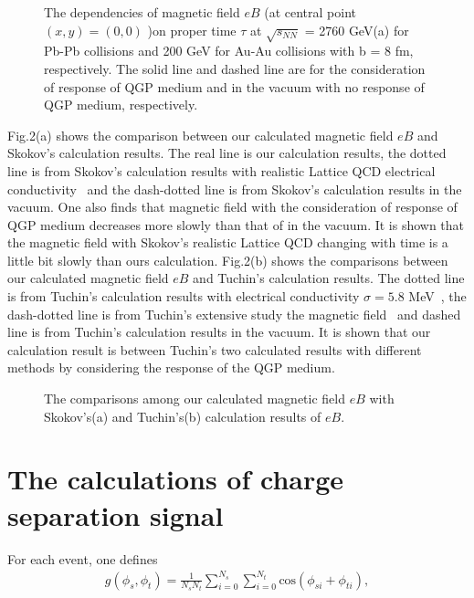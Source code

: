 \documentclass[twocolumn,showpacs,preprintnumbers,amsmath,amssymb]{revtex4}
\begin{document}
\begin{figure}[h!]
\centering {}
\caption{The dependencies of magnetic field $eB$ (at central point $(x, y) = (0, 0)$ )on proper time $\tau$ at $\sqrt{s_{NN}}$ = 2760 GeV(a) for Pb-Pb collisions
and 200 GeV for Au-Au collisions with b = 8 fm, respectively. The solid line and dashed line are for the consideration of response of QGP medium and in the vacuum with no
response of QGP medium, respectively.}
\label{fig1} %
\end{figure}

Fig.2(a) shows the comparison between our calculated magnetic field $eB$ and Skokov's calculation results. The real line is our calculation results, the dotted line is from Skokov's calculation results with realistic Lattice QCD electrical conductivity~\cite{lab19} and the dash-dotted line is from Skokov's calculation results in the vacuum. One also finds that magnetic field with the consideration of response of QGP medium decreases more slowly than that of in the vacuum. It is shown that the magnetic field with Skokov's realistic Lattice QCD changing with time is a little bit slowly than ours calculation. Fig.2(b) shows the comparisons between our calculated magnetic field $eB$ and Tuchin's calculation results. The dotted line is from Tuchin's calculation results with electrical conductivity $\sigma=5.8$ MeV~\cite{lab17}, the dash-dotted line is from Tuchin's  extensive study the magnetic field~\cite{lab21}
and dashed line is from Tuchin's calculation results in the vacuum.
It is shown that our calculation result is between Tuchin's two calculated results with different methods by considering the response of the QGP medium.


\hskip0.2cm

\begin{figure}[h!]
\centering {}
\caption{The comparisons among our calculated magnetic field $eB$ with Skokov's(a) and Tuchin's(b) calculation results of $eB$.}
\label{fig2} %
\end{figure}


\section{The calculations of charge separation signal }
For each event, one defines~\cite{lab29}
\begin{eqnarray}
g(\phi_{s},\phi_{t})=\frac{1}{N_{s}N_{t}}\sum_{i=0}^{N_{s}}\sum_{i=0}^{N_{t}}\textrm{cos}(\phi_{si}+\phi_{ti}),
\label{eq:eq24} %
\end{eqnarray}
\end{document}
